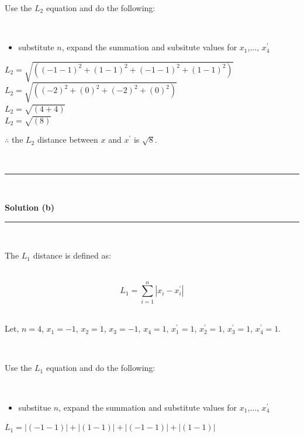 \documentclass{article}
\begin{document}
\parbox{\textwidth}{Use the $L_2$ equation and do the following:}\\

\begin{itemize}
    \item {substitute $n$, expand the summation and subsitute values for $x_1$,..., $x^{\prime}_4$}\\
\end{itemize}

$L_2 = \sqrt{\left((-1 - 1)^2+(1 - 1)^2+(-1 - 1)^2+(1 - 1)^2\right)}$\\

$L_2 = \sqrt{\left((-2)^2+(0)^2+(-2)^2+(0)^2\right)}$\\

$L_2 = \sqrt{\left(4+4\right)}$\\

$L_2 = \sqrt{\left(8\right)}$\\

\parbox{\textwidth}{$\therefore$ the $L_2$ distance between $x$ and $x^{\prime}$ is $\sqrt{8}$.}\\

\noindent\rule{\textwidth}{0.4pt}\\

\newpage

\textbf{Solution (b)}

\noindent\rule{\textwidth}{0.4pt}\\

\parbox{\textwidth}{The $L_1$ distance is defined as:}\\

$$L_1 = \sum_{i=1}^{n} |x_i - x^{\prime}_i|$$\\

\parbox{\textwidth}{Let, $n = 4$, $x_1 = -1$, $x_2 = 1$, $x_3 = -1$, $x_4 = 1$, $x^{\prime}_1 = 1$, $x^{\prime}_2 = 1$, $x^{\prime}_3 = 1$, $x^{\prime}_4 = 1$.}\\

\parbox{\textwidth}{Use the $L_1$ equation and do the following:}\\

\begin{itemize}
    \item {substitue $n$, expand the summation and substitute values for $x_1$,..., $x^{\prime}_4$}\\
\end{itemize}

$L_1 = |(-1 - 1)| + |(1 - 1)| + |(-1 - 1)| + |(1 - 1)|$\\
\end{document}
